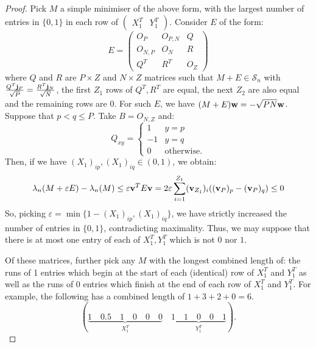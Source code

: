 \documentclass[12pt]{article}
\begin{document}
\begin{proof}
Pick $M$ a simple minimiser of the above form, with the largest number of entries in $\{0,1\}$ in each row of $\begin{pmatrix}X_1^T & Y_1^T\end{pmatrix}$. Consider $E$ of the form:
\begin{equation*}
    E=\begin{pmatrix}
            O_{P} & O_{P,N} & Q \\ O_{N,P} & O_{N} & R \\ Q^T & R^T & O_{Z}\end{pmatrix}
\end{equation*}
where $Q$ and $R$ are $P\times Z$ and $N\times Z$ matrices such that $M+E\in \mathcal{S}_n$ with $\frac{Q^T\bold{j}_P}{\sqrt{P}} = \frac{R^T\bold{j}_N}{\sqrt{N}}$, the first $Z_1$ rows of $Q^T,R^T$ are equal, the next $Z_2$ are also equal and the remaining rows are 0. For such $E$, we have $(M+E)\bold{w} = -\sqrt{PN}\bold{w}$. Suppose that $p<q\le P$. Take $B=O_{N,Z}$ and:
\begin{equation*}
    Q_{xy} = \begin{cases}1 & y=p\\ -1 & y=q\\ 0 & \text{otherwise.}\end{cases}
\end{equation*}
Then, if we have $(X_1)_{ip}, (X_1)_{iq} \in (0,1)$, we obtain:
\begin{equation*}
    \lambda_{n}(M+\varepsilon E)-\lambda_{n}(M)\le \varepsilon \bold{v}^{T}E\bold{v} = 2\varepsilon \sum_{i=1}^{Z_1}(\bold{v}_{Z_1})_i((\bold{v}_{P})_p - (\bold{v}_{P})_q) \le 0
\end{equation*}
So, picking $\varepsilon=\min\{1-(X_1)_{ip},(X_1)_{iq}\}$, we have strictly increased the number of entries in $\{0,1\}$, contradicting maximality. Thus, we may suppose that there is at most one entry of each of $X_1^T, Y_1^T$ which is not $0$ nor $1$. 

Of these matrices, further pick any $M$ with the longest combined length of: the runs of 1 entries which begin at the start of each (identical) row of $X_1^T$ and $Y_1^T$ as well as the runs of 0 entries which finish at the end of each row of $X_1^T$ and $Y_1^T$. For example, the following has a combined length of $1 + 3 + 2 + 0 = 6$. 
\[(\underbrace{1 \quad 0.5 \quad 1 \quad 0 \quad 0 \quad 0}_{X_1^T} \quad \underbrace{1 \quad 1 \quad 0 \quad 0 \quad 1}_{Y_1^T}).\]


\end{proof}
\end{document}
